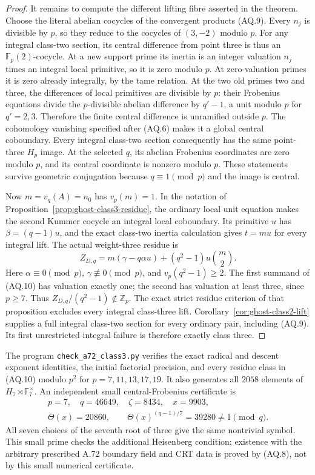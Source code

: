 \begin{proof}
It remains to compute the different lifting
fibre asserted in the theorem.
Choose the literal abelian cocycles of the
convergent products (AQ.9).
Every \(n_j\) is divisible by \(p\), so they
reduce to the cocycles of \((3,-2)\) modulo
\(p\).
For any integral class-two section, its
central difference from point three is thus
an \(\mathbb F_p(2)\)-cocycle.
At a new support prime its inertia is an
integer valuation \(n_j\) times an integral
local primitive, so it is zero modulo \(p\).
At zero-valuation primes it is zero already
integrally, by the tame relation.
At the two old primes two and three, the
differences of local primitives are divisible
by \(p\): their Frobenius equations divide
the \(p\)-divisible abelian difference by
\(q'-1\), a unit modulo \(p\) for
\(q'=2,3\).
Therefore the finite central difference
is unramified outside \(p\).
The cohomology vanishing specified after
(AQ.6) makes it a global central coboundary.
Every integral class-two section consequently
has the same point-three \(H_p\) image.
At the selected \(q\), its abelian Frobenius
coordinates are zero modulo \(p\), and its
central coordinate is nonzero modulo \(p\).
These statements survive geometric conjugation
because \(q\equiv1\pmod p\) and the image
is central.

Now \(m=v_q(A)=n_0\) has \(v_p(m)=1\).
In the notation of
Proposition~\ref{prop:ghost-class3-residue},
the ordinary local unit equation makes the
second Kummer cocycle an integral local
coboundary. Its primitive \(u\) has
\(\beta=(q-1)u\), and the exact class-two
inertia calculation gives \(t=mu\) for every
integral lift.
The actual weight-three residue is
\[
 Z_{D,q}
   =m(\gamma-q\alpha u)
          +(q^2-1)u\binom m2.
 \tag{AQ.10}
\]
Here \(\alpha\equiv0\pmod p\),
\(\gamma\not\equiv0\pmod p\), and
\(v_p(q^2-1)\ge2\).
The first summand of (AQ.10) has valuation
exactly one; the second has valuation at
least three, since \(p\ge7\).
Thus \(Z_{D,q}/(q^2-1)\notin\mathbb Z_p\).
The exact strict residue criterion of that
proposition excludes every integral
class-three lift.
Corollary~\ref{cor:ghost-class2-lift} supplies
a full integral class-two section for every
ordinary pair, including (AQ.9).
Its first unrestricted integral failure is
therefore exactly class three.
\end{proof}

The program \texttt{check\_a72\_class3.py} verifies
the exact radical and descent exponent identities,
the initial factorial precision, and every residue
class in (AQ.10) modulo \(p^2\) for
\(p=7,11,13,17,19\).
It also generates all \(2058\) elements of
\(H_7\rtimes\mathbb F_7^\times\).
An independent small central-Frobenius certificate is
\[
 \begin{gathered}
 p=7,\quad q=46649,\quad \zeta=8434,\quad x=9903,\\
 \Theta(x)=20860,\qquad
 \Theta(x)^{(q-1)/7}=39280\ne1\pmod q.
 \end{gathered}
\]
All seven choices of the seventh root of three
give the same nontrivial symbol.
This small prime checks the additional Heisenberg
condition; existence with the arbitrary prescribed
A.72 boundary field and CRT data is proved by
(AQ.8), not by this small numerical certificate.
